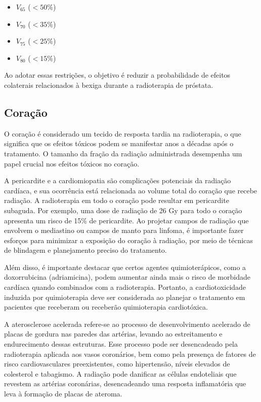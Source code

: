 \documentclass[11pt,a4paper]{article}
\newcounter{exemplo}
\begin{document}
	\begin{itemize}
		\item $V_{65}$ ($< 50\%$)
		\item $V_{70}$ ($< 35\%$)
		\item $V_{75}$ ($< 25\%$)
		\item $V_{80}$ ($< 15\%$)
	\end{itemize}

	Ao adotar essas restrições, o objetivo é reduzir a probabilidade de efeitos colaterais relacionados à bexiga durante a radioterapia de próstata.

\subsection*{Coração}

	O coração é considerado um tecido de resposta tardia na radioterapia, o que significa que os efeitos tóxicos podem se manifestar anos a décadas após o tratamento. O tamanho da fração da radiação administrada desempenha um papel crucial nos efeitos tóxicos no coração.

	A pericardite e a cardiomiopatia são complicações potenciais da radiação cardíaca, e sua ocorrência está relacionada ao volume total do coração que recebe radiação. A radioterapia em todo o coração pode resultar em pericardite subaguda. Por exemplo, uma dose de radiação de 26 Gy para todo o coração apresenta um risco de 15\% de pericardite. Ao projetar campos de radiação que envolvem o mediastino ou campos de manto para linfoma, é importante fazer esforços para minimizar a exposição do coração à radiação, por meio de técnicas de blindagem e planejamento preciso do tratamento.

	Além disso, é importante destacar que certos agentes quimioterápicos, como a doxorrubicina (adriamicina), podem aumentar ainda mais o risco de morbidade cardíaca quando combinados com a radioterapia. Portanto, a cardiotoxicidade induzida por quimioterapia deve ser considerada ao planejar o tratamento em pacientes que receberam ou receberão quimioterapia cardiotóxica.

	A aterosclerose acelerada refere-se ao processo de desenvolvimento acelerado de placas de gordura nas paredes das artérias, levando ao estreitamento e endurecimento dessas estruturas. Esse processo pode ser desencadeado pela radioterapia aplicada aos vasos coronários, bem como pela presença de fatores de risco cardiovasculares preexistentes, como hipertensão, níveis elevados de colesterol e tabagismo. A radiação pode danificar as células endoteliais que revestem as artérias coronárias, desencadeando uma resposta inflamatória que leva à formação de placas de ateroma.
\end{document}
